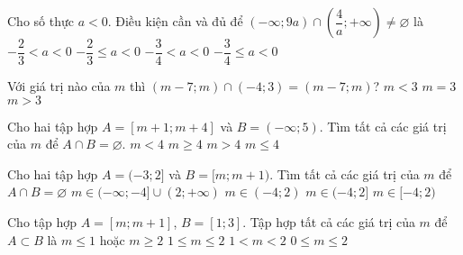 \begin{ex}%
	Cho số thực $a<0$. Điều kiện cần và đủ để $(-\infty ; 9a) \cap \left( {\dfrac{4}{a};+\infty}\right)  \neq  \varnothing$ là
	\choice
	{\True $-\dfrac{2}{3}<a<0$}
	{$-\dfrac{2}{3}\leq a<0$}
	{$-\dfrac{3}{4}<a<0$}
	{$-\dfrac{3}{4}\leq a<0$}
\end{ex}

\begin{ex}%
	Với giá trị nào của $m$ thì $(m-7;m)\cap (-4;3)=(m-7;m)$?
	{$m<3 $}
	{\True $m=3 $}
	{$ m>3$}
\end{ex}

\begin{ex}%
	Cho hai tập hợp $A=[m+1;m+4]$ và $B=(-\infty;5)$. Tìm tất cả các giá trị của $m$ để $A \cap B=\varnothing$.
	\choice
	{$m<4$}
	{\True $m\geq 4$}
	{$m>4$}
	{$m\leq 4$}
\end{ex}

\begin{ex}%
	Cho hai tập hợp $A = (-3; 2]$ và $B = [m; m + 1)$. Tìm tất cả các giá trị của $m$ để $A \cap B=\varnothing$
	\choice
	{\True $m \in (-\infty;-4]\cup (2;+\infty)$}
	{$m \in (-4;2)$}
	{$m \in (-4;2]$}
	{$m \in [-4;2)$}
	\loigiai{
		Ta có
		\[A\cap B=\varnothing\Leftrightarrow \hoac{&m> 2\\ &m+1\le -3}\Leftrightarrow \hoac{&m> 2\\ &m\le -4}\Leftrightarrow m\in (-\infty;-4]\cup (2;+\infty).\]
	}
\end{ex}

\begin{ex}%
	Cho tập hợp $A=\left[m; m+1\right]$, $B=[1; 3]$. Tập hợp tất cả các giá trị của $m$ để $A\subset B$ là
	\choice
	{$m\le 1$ hoặc $m\ge 2$}
	{\True $1\le m\le 2$}
	{$1<m<2$}
	{$0\le m\le 2$}
\end{ex}

